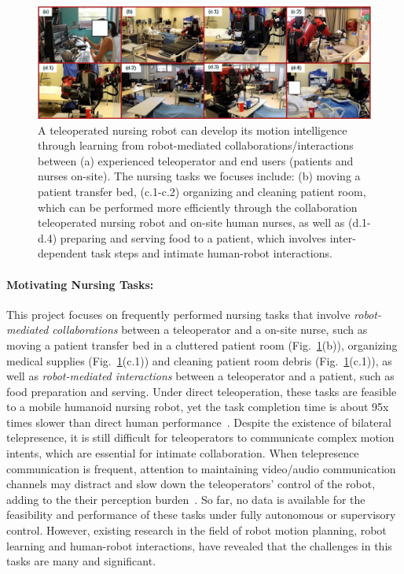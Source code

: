 \documentclass[letterpaper, 11 pt, onecolumn]{article}
\newcommand{\fig}[1]{Fig.~\ref{#1}}
\begin{document}
\begin{figure}[h!!]
\centering
\includegraphics[width=0.99\linewidth]{fig//DemoTasks}
\caption{ A teleoperated nursing robot can develop its motion intelligence through learning from robot-mediated collaborations/interactions between (a) experienced teleoperator and end users (patients and nurses on-site). The nursing tasks we focuses include: (b) moving a patient transfer bed, (c.1-c.2) organizing and cleaning patient room, which can be performed more efficiently through the collaboration teleoperated nursing robot and on-site human nurses, as well as (d.1-d.4) preparing and serving food to a patient, which involves inter-dependent task steps and intimate human-robot interactions. }
\label{Tasks}
\end{figure}

\paragraph*{Motivating Nursing Tasks:} This project focuses on frequently performed nursing tasks that involve \textit{robot-mediated collaborations} between a teleoperator and a on-site nurse, such as moving a patient transfer bed in a cluttered patient room (\fig{Tasks}(b)), organizing medical supplies (\fig{Tasks}(c.1)) and cleaning patient room debris (\fig{Tasks}(c.1)), as well as  \textit{robot-mediated interactions} between a teleoperator and a patient, such as food preparation and serving. Under direct teleoperation, these tasks are feasible to a mobile humanoid nursing robot, yet the task completion time is about 95x times slower than direct human performance~\cite{Hauser_Li_TRINA:17}. Despite the existence of bilateral telepresence, it is still difficult for teleoperators to communicate complex motion intents, which are essential for intimate collaboration. When telepresence communication is frequent, attention to maintaining video/audio communication channels may distract and slow down the teleoperators' control of the robot, adding to the their perception burden~\cite{Hauser_Li_BiTelepresence:17}. So far, no data is available for the feasibility and performance of these tasks under fully autonomous or supervisory control. However, existing research in the field of robot motion planning, robot learning and human-robot interactions, have revealed that the challenges in this tasks are many and significant. 
\end{document}
